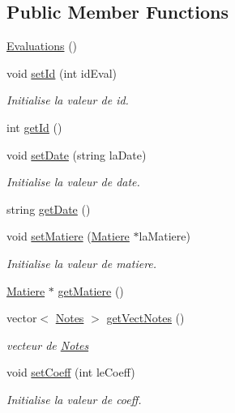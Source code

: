 \subsection*{Public Member Functions}
\begin{DoxyCompactItemize}
\item 
\hyperlink{class_evaluations_a39ff3292c509ccd40f3ae6ff1cabdcdc}{Evaluations} ()
\item 
void \hyperlink{class_evaluations_a4c7fa1184ee01cfd86a23f3a3050f0af}{set\+Id} (int id\+Eval)
\begin{DoxyCompactList}\small\item\em Initialise la valeur de id. \end{DoxyCompactList}\item 
int \hyperlink{class_evaluations_af9e13687ffeaa9a3197b38aa3777332b}{get\+Id} ()
\item 
void \hyperlink{class_evaluations_a91fa36ac406432cc0654e3931816ae9a}{set\+Date} (string la\+Date)
\begin{DoxyCompactList}\small\item\em Initialise la valeur de date. \end{DoxyCompactList}\item 
string \hyperlink{class_evaluations_ad1d9aafa1b0fe8999a6315194db6ead5}{get\+Date} ()
\item 
void \hyperlink{class_evaluations_af2fdf8aecb0c90fa657fc16cfc284d5c}{set\+Matiere} (\hyperlink{class_matiere}{Matiere} $\ast$la\+Matiere)
\begin{DoxyCompactList}\small\item\em Initialise la valeur de matiere. \end{DoxyCompactList}\item 
\hyperlink{class_matiere}{Matiere} $\ast$ \hyperlink{class_evaluations_a71be15e875c9430528f0f5af9130be21}{get\+Matiere} ()
\item 
vector$<$ \hyperlink{class_notes}{Notes} $>$ \hyperlink{class_evaluations_a3b6e0ec91214a1684914e17ac07fd976}{get\+Vect\+Notes} ()
\begin{DoxyCompactList}\small\item\em vecteur de \hyperlink{class_notes}{Notes} \end{DoxyCompactList}\item 
void \hyperlink{class_evaluations_a06a452d21a1bb0e89bda2ba9b0de9e71}{set\+Coeff} (int le\+Coeff)
\begin{DoxyCompactList}\small\item\em Initialise la valeur de coeff. \end{DoxyCompactList}\item 

\end{DoxyCompactItemize}
